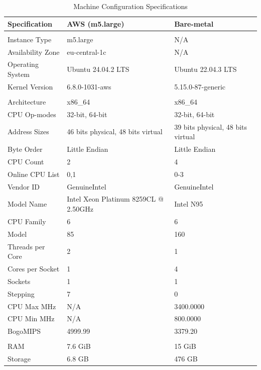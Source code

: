 \begin{table}[H]
\centering
\caption{Machine Configuration Specifications}
\label{tab:machine_config}
\begin{tabular}{>{\raggedright}p{3.5cm}p{5cm}p{5cm}}
\toprule
\textbf{Specification} & \textbf{AWS (m5.large)} & \textbf{Bare-metal} \\
\midrule
\multicolumn{3}{l}{\textbf{System Information}} \\
Instance Type & m5.large & N/A \\
Availability Zone & eu-central-1c & N/A \\
Operating System & Ubuntu 24.04.2 LTS & Ubuntu 22.04.3 LTS \\
Kernel Version & 6.8.0-1031-aws & 5.15.0-87-generic \\
\midrule
\multicolumn{3}{l}{\textbf{CPU Specifications}} \\
Architecture & x86\_64 & x86\_64 \\
CPU Op-modes & 32-bit, 64-bit & 32-bit, 64-bit \\
Address Sizes & 46 bits physical, 48 bits virtual & 39 bits physical, 48 bits virtual \\
Byte Order & Little Endian & Little Endian \\
CPU Count & 2 & 4 \\
Online CPU List & 0,1 & 0-3 \\
Vendor ID & GenuineIntel & GenuineIntel \\
Model Name & Intel Xeon Platinum 8259CL @ 2.50GHz & Intel N95 \\
CPU Family & 6 & 6 \\
Model & 85 & 160 \\
Threads per Core & 2 & 1 \\
Cores per Socket & 1 & 4 \\
Sockets & 1 & 1 \\
Stepping & 7 & 0 \\
CPU Max MHz & N/A & 3400.0000 \\
CPU Min MHz & N/A & 800.0000 \\
BogoMIPS & 4999.99 & 3379.20 \\
\midrule
\multicolumn{3}{l}{\textbf{Memory \& Storage}} \\
RAM & 7.6 GiB & 15 GiB \\
Storage & 6.8 GB & 476 GB \\
\bottomrule
\end{tabular}
\end{table}

